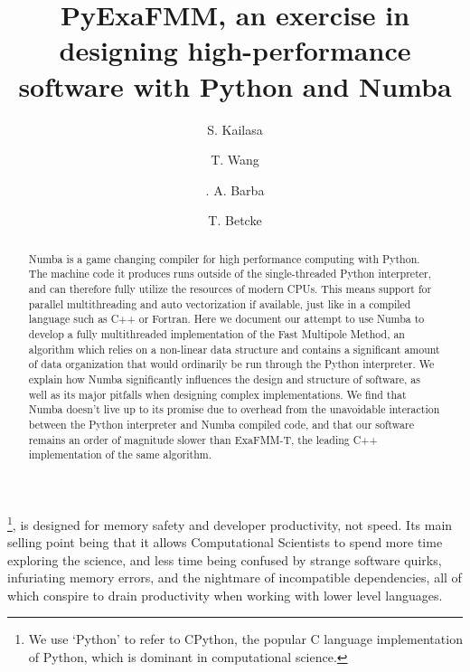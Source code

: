 \documentclass{IEEEcsmag}
\begin{document}

\title{PyExaFMM, an exercise in designing high-performance software with Python and Numba}

\author{S. Kailasa}

\author{T. Wang}

\author{. A. Barba}

\author{T. Betcke}


\begin{abstract}
    Numba is a game changing compiler for high performance computing with Python. The machine code it produces runs outside of the single-threaded Python interpreter, and can therefore fully utilize the resources of modern CPUs. This means support for parallel multithreading and auto vectorization if available, just like in a compiled language such as C++ or Fortran. Here we document our attempt to use Numba to develop a fully multithreaded implementation of the Fast Multipole Method, an algorithm which relies on a non-linear data structure and contains a significant amount of data organization that would ordinarily be run through the Python interpreter. We explain how Numba significantly influences the design and structure of software, as well as its major pitfalls when designing complex implementations. We find that Numba doesn't live up to its promise due to overhead from the unavoidable interaction between the Python interpreter and Numba compiled code, and that our software remains an order of magnitude slower than ExaFMM-T, the leading C++ implementation of the same algorithm.
\end{abstract}

\maketitle
{}\footnote{We use `Python' to refer to CPython, the popular C language implementation of Python, which is dominant in computational science.}, is designed for memory safety and developer productivity, not speed. Its main selling point being that it allows Computational Scientists to spend more time exploring the science, and less time being confused by strange software quirks, infuriating memory errors, and the nightmare of incompatible dependencies, all of which conspire to drain productivity when working with lower level languages.
\end{document}
